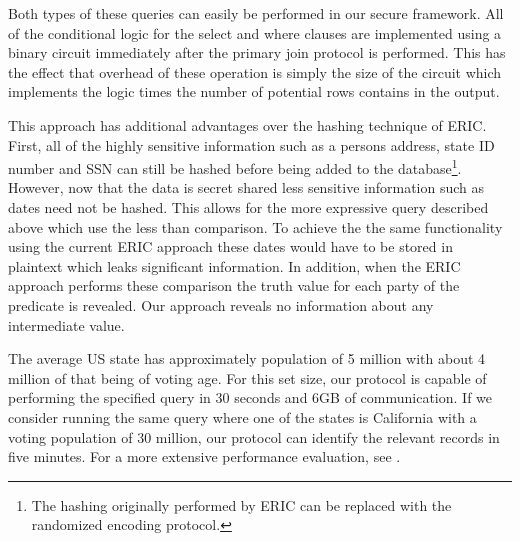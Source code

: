 Both types of these queries can easily be performed in our secure framework. All of the conditional logic for the select and where clauses are implemented using a binary circuit immediately after the primary join protocol is performed. This has the effect that overhead of these operation is simply the size of the circuit which implements the logic times the number of potential rows contains in the output. 

This approach has additional advantages over the hashing technique of ERIC. First, all of the highly sensitive information such as a persons address, state ID number and SSN can still be hashed before being added to the database\footnote{The hashing originally performed by ERIC can be replaced with the randomized encoding protocol.}. However, now that the data is secret shared less sensitive information such as dates need not be hashed. This allows for the more expressive query described above which use the less than comparison. To achieve the the same functionality using the current ERIC approach these dates would have to be stored in plaintext which leaks significant information. In addition, when the ERIC approach performs these comparison the truth value for each party of the predicate is revealed. Our approach reveals no information about any intermediate value. 

The average US state has approximately population of 5 million with about 4 million of that being of voting age. For this set size, our protocol is capable of performing the specified query in 30 seconds and 6GB of communication. If we consider running the same query where one of the states is California with a voting population of 30 million, our protocol can identify the relevant records in five minutes. For a more extensive performance evaluation, see .


